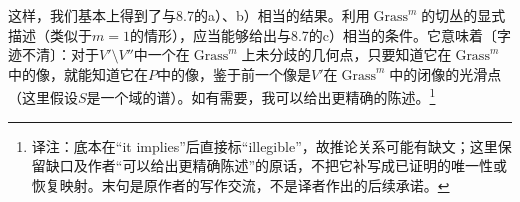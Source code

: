 \documentclass[openany,fontset=fandol]{ctexbook}
\newcommand{\note}[1]{\footnote{译注：#1}}
\begin{document}
这样，我们基本上得到了与8.7的a）、b）相当的结果。利用$\operatorname{Grass}^{m}$的切丛的显式描述（类似于$m=1$的情形），应当能够给出与8.7的c）相当的条件。它意味着〔字迹不清〕：对于$V'\setminus V''$中一个在$\operatorname{Grass}^{m}$上未分歧的几何点，只要知道它在$\operatorname{Grass}^{m}$中的像，就能知道它在$P$中的像，鉴于前一个像是$V'$在$\operatorname{Grass}^{m}$中的闭像的光滑点（这里假设$S$是一个域的谱）。如有需要，我可以给出更精确的陈述。\note{底本在“it implies”后直接标“illegible”，故推论关系可能有缺文；这里保留缺口及作者“可以给出更精确陈述”的原话，不把它补写成已证明的唯一性或恢复映射。末句是原作者的写作交流，不是译者作出的后续承诺。}
\end{document}
